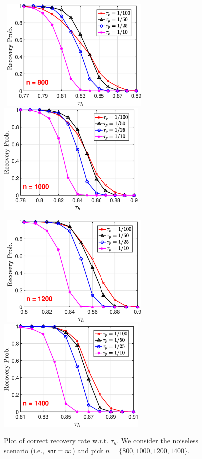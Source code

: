 \documentclass[11pt]{article}
\begin{document}
\begin{figure}[h]
\centering
    \mbox{
    \includegraphics[width = 2.8in]{figs/TauPB_mat_n800.eps}\hspace{0.2in}
    \includegraphics[width = 2.8in]{figs/TauPB_mat_n1000.eps}
    }

    \mbox{
    \includegraphics[width = 2.8in]{figs/TauPB_mat_n1200.eps}\hspace{0.2in}
    \includegraphics[width = 2.8in]{figs/TauPB_mat_n1400.eps}
    }

    \vspace{-0.1in}

    \caption{Plot of correct recovery rate w.r.t. $\tau_h$.
    We consider the noiseless scenario (i.e., $\mathsf{snr}= \infty$) and
    pick $n= \{800, 1000, 1200, 1400\}$.
    }
    \label{fig:corr_rate}%
\end{figure}
\end{document}
